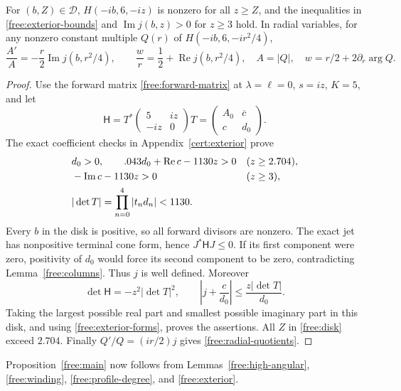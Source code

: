\begin{lemma}\label{free:exterior}
For $(b,Z)\in\mathcal D$, $H(-ib,6,-iz)$ is nonzero for all $z\ge Z$,
and the inequalities in \eqref{free:exterior-bounds} and
$\operatorname{Im}j(b,z)>0$ for $z\ge3$ hold.  In radial variables,
for any nonzero constant multiple $Q(r)$ of $H(-ib,6,-ir^2/4)$,
\begin{equation}\label{free:radial-quotients}
 \frac{A'}A=-\frac r2\operatorname{Im}j(b,r^2/4),\qquad
 \frac wr=\frac12+\operatorname{Re}j(b,r^2/4),
 \quad A=|Q|,\quad w=r/2+2\partial_r\arg Q.
\end{equation}
\end{lemma}

\begin{proof}
Use the forward matrix \eqref{free:forward-matrix} at
$\lambda=\ell=0$, $s=iz$, $K=5$, and let
\[
 \mathsf H=T^*\begin{pmatrix}5&iz\\-iz&0\end{pmatrix}T
   =\begin{pmatrix}A_0&\overline c\\c&d_0\end{pmatrix}.
\]
The exact coefficient checks in Appendix~\ref{cert:exterior} prove
\begin{align}\label{free:exterior-forms}
 &d_0>0,\qquad .043d_0+\operatorname{Re}c-1130z>0
 &&(z\ge2.704),\notag\\
 &-\operatorname{Im}c-1130z>0&&(z\ge3),\notag\\
 &|\det T|=\prod_{n=0}^4|t_nd_n|<1130.
\end{align}
Every $b$ in the disk is positive, so all forward divisors are
nonzero.  The exact jet has nonpositive terminal cone form, hence
$J^*\mathsf HJ\le0$.  If its first component were zero, positivity
of $d_0$ would force its second component to be zero, contradicting
Lemma~\ref{free:columns}.  Thus $j$ is well defined.  Moreover
\[
 \det\mathsf H=-z^2|\det T|^2,
 \qquad \left|j+\frac c{d_0}\right|
 \le\frac{z|\det T|}{d_0}.
\]
Taking the largest possible real part and smallest possible imaginary
part in this disk, and using \eqref{free:exterior-forms}, proves the
assertions.  All $Z$ in \eqref{free:disk} exceed $2.704$.
Finally $Q'/Q=(ir/2)j$ gives \eqref{free:radial-quotients}.
\end{proof}

Proposition~\ref{free:main} now follows from
Lemmas~\ref{free:high-angular}, \ref{free:winding},
\ref{free:profile-degree}, and \ref{free:exterior}.
